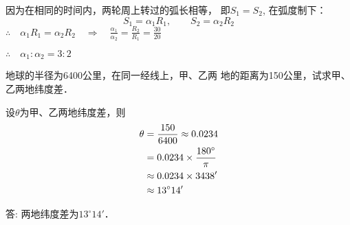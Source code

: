 \begin{solution}
    因为在相同的时间内，两轮周上转过的弧长相等，
    即$S_1=S_2$, 在弧度制下：
\[S_1=\alpha_1 R_1,\qquad S_2=\alpha_2 R_2\]
$\therefore\quad \alpha_1R_1=\alpha_2R_2 \quad \Rightarrow\quad \frac{\alpha_1}{\alpha_2}=\frac{R_2}{R_1}=\frac{30}{20}$

$\therefore\quad \alpha_1:\alpha_2=3:2 $
\end{solution}

\begin{example}
    地球的半径为6400公里，在同一经线上，甲、乙两
地的距离为150公里，试求甲、乙两地纬度差．
\end{example}


\begin{solution}
设$\theta$为甲、乙两地纬度差，则
\[\begin{split}
    \theta &= \dfrac{150}{6400}\approx 0.0234\\
    &=0.0234\times\dfrac{180^{\circ}}{\pi}\\
    &\approx 0.0234\times 3438'\\
    &\approx 13^{\circ}14'
\end{split}\]

答: 两地纬度差为$13^{\circ}14'$．
\end{solution}

